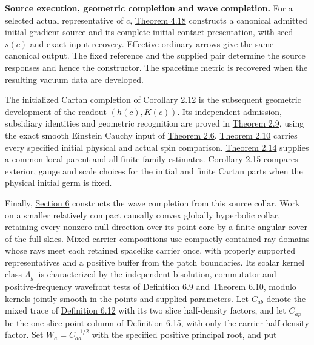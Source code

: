 \documentclass[
  english,
  11pt,
  reqno]{amsart}
\begin{document}
\textbf{Source execution, geometric completion and wave completion.} For
a selected actual representative of \(c\),
\hyperref[thm:online-ordinary-negative-response-initial-source]{Theorem
4.18} constructs a canonical admitted initial gradient source and its
complete initial contact presentation, with seed \(s(c)\) and exact
input recovery. Effective ordinary arrows give the same canonical
output. The fixed reference and the supplied pair determine the source
responses and hence the constructor. The spacetime metric is recovered
when the resulting vacuum data are developed.

The initialized Cartan completion of
\hyperref[cor:online-ordinary-pair-cartan-collar]{Corollary 2.12} is the
subsequent geometric development of the readout \((h(c),K(c))\). Its
independent admission, subsidiary identities and geometric recognition
are proved in \hyperref[thm:online-cartan-collar-recognition]{Theorem
2.9}, using the exact smooth Einstein Cauchy input of
\hyperref[thm:online-smooth-local-cauchy-input]{Theorem 2.6}.
\hyperref[thm:online-marked-collar-full-hom]{Theorem 2.10} carries every
specified initial physical and actual spin comparison.
\hyperref[thm:online-common-collar-finite-families]{Theorem 2.14}
supplies a common local parent and all finite family estimates.
\hyperref[cor:online-fixed-slice-geometric-choice-independence]{Corollary
2.15} compares exterior, gauge and scale choices for the initial and
finite Cartan parts when the physical initial germ is fixed.

Finally, \hyperref[sec:online-covariant-wave-enrichment]{Section 6}
constructs the wave completion from this source collar. Work on a
smaller relatively compact causally convex globally hyperbolic collar,
retaining every nonzero null direction over its point core by a finite
angular cover of the full skies. Mixed carrier compositions use
compactly contained ray domains whose rays meet each retained spacelike
carrier once, with properly supported representatives and a positive
buffer from the patch boundaries. Its scalar kernel class
\(\Lambda_g^+\) is characterized by the independent bisolution,
commutator and positive-frequency wavefront tests of
\hyperref[def:online-independent-wave-kernel]{Definition 6.9} and
\hyperref[thm:online-canonical-wave-kernel]{Theorem 6.10}, modulo
kernels jointly smooth in the points and supplied parameters. Let
\(C_{ab}\) denote the mixed trace of
\hyperref[def:online-wave-carrier-displays]{Definition 6.12} with its
two slice half-density factors, and let \(C_{ap}\) be the one-slice
point column of \hyperref[def:online-wave-evaluation-section]{Definition
6.15}, with only the carrier half-density factor. Set
\(W_a=C_{aa}^{-1/2}\) with the specified positive principal root, and
put
\end{document}
